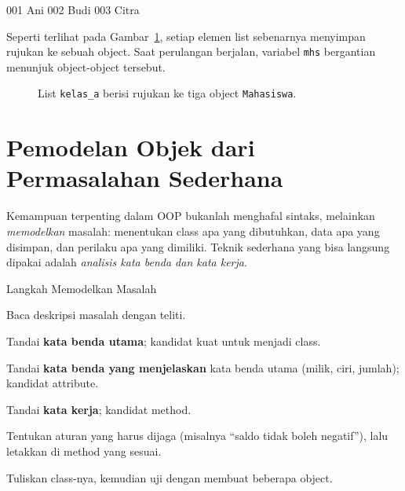 \begin{keluaran}
001 Ani
002 Budi
003 Citra
\end{keluaran}

Seperti terlihat pada Gambar~\ref{fig:b1-list-object}, setiap elemen list sebenarnya menyimpan rujukan ke sebuah object. Saat perulangan berjalan, variabel \texttt{mhs} bergantian menunjuk object-object tersebut.

\begin{figure}[htbp]
\centering
{}
\caption{List \texttt{kelas\_a} berisi rujukan ke tiga object \texttt{Mahasiswa}.}
\label{fig:b1-list-object}
\end{figure}

\section{Pemodelan Objek dari Permasalahan Sederhana}

Kemampuan terpenting dalam OOP bukanlah menghafal sintaks, melainkan \emph{memodelkan} masalah: menentukan class apa yang dibutuhkan, data apa yang disimpan, dan perilaku apa yang dimiliki. Teknik sederhana yang bisa langsung dipakai adalah \emph{analisis kata benda dan kata kerja}.

\begin{langkah}{Langkah Memodelkan Masalah}
  \item Baca deskripsi masalah dengan teliti.
  \item Tandai \textbf{kata benda utama}; kandidat kuat untuk menjadi class.
  \item Tandai \textbf{kata benda yang menjelaskan} kata benda utama (milik, ciri, jumlah); kandidat attribute.
  \item Tandai \textbf{kata kerja}; kandidat method.
  \item Tentukan aturan yang harus dijaga (misalnya ``saldo tidak boleh negatif''), lalu letakkan di method yang sesuai.
  \item Tuliskan class-nya, kemudian uji dengan membuat beberapa object.
\end{langkah}

